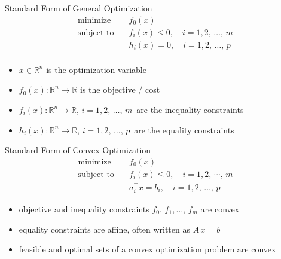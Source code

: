 \documentclass[10pt,handout]{beamer}
\newcommand{\ds}{\displaystyle}
\theoremstyle{definition}
\begin{document}
\begin{frame}
  \begin{block}{Standard Form of General Optimization}
    \vspace{-5mm}
    \begin{align*}
      \text{minimize}\quad &f_0(x) \\
      \text{subject to}\quad &f_i(x)\leqslant 0, \quad i = 1, 2,\,\ldots,\,m \\
      \qquad\qquad &h_i(x) = 0, \quad i = 1, 2,\,\ldots,\,p \\
    \end{align*}

    \vspace{-9mm}
    \begin{itemize}
      \item $\ds x\in\mathbb{R}^n$ is the optimization variable
      \item $\ds f_0(x):\mathbb{R}^n\to\mathbb{R}$ is the objective / cost 
      \item $\ds f_i(x):\mathbb{R}^n\to\mathbb{R}$, $i = 1, 2,\,\ldots,\,m\,$ are the inequality constraints 
      \item $\ds h_i(x):\mathbb{R}^n\to\mathbb{R}$, $i = 1, 2,\,\ldots,\,p\,$ are the equality constraints 
    \end{itemize}
  \end{block}

  \begin{block}{Standard Form of Convex Optimization}
  \vspace{-5mm}
  \begin{align*}
    \text{minimize}\quad &f_0(x) \\
    \text{subject to}\quad &f_i(x)\leqslant 0, \quad i = 1, 2,\,\cdots,\,m \\
    \qquad\qquad &a_i^\top x = b_i, \quad i = 1, 2,\,\ldots,\,p
  \end{align*}
  \vspace{-8mm}
  \begin{itemize}
    \item objective and inequality constraints $f_0$, $f_1$,$\,\ldots,\,$$f_m$ are convex
    \item equality constraints are affine, often written as $\ds A\,x = b$
    \item feasible and optimal sets of a convex optimization problem are convex
  \end{itemize}
  \end{block}
\end{frame}
\end{document}
